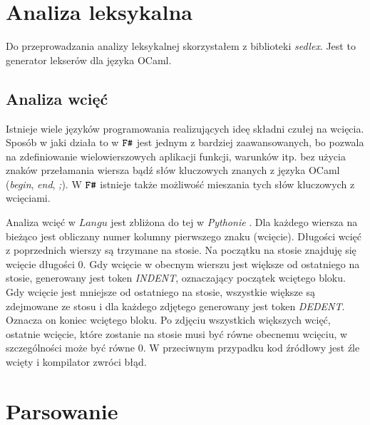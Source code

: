 \documentclass[declaration,shortabstract]{iithesis}
\begin{document}


\section{Analiza leksykalna}

Do przeprowadzania analizy leksykalnej skorzystałem z biblioteki 
\textit{sedlex}. Jest to generator lekserów dla języka OCaml.

\subsection{Analiza wcięć} \label{wciecia_omowienie}
 
Istnieje wiele języków programowania realizujących ideę składni czułej na 
wcięcia. Sposób w jaki działa to w $\verb!F#!$ jest jednym z bardziej zaawansowanych,
bo pozwala na zdefiniowanie wielowierszowych aplikacji funkcji, warunków itp. 
bez użycia znaków przełamania wiersza bądź słów kluczowych znanych 
z języka OCaml (\textit{begin}, \textit{end}, \textit{;}). W $\verb!F#!$ 
istnieje 
także możliwość mieszania tych słów kluczowych z wcięciami. 

Analiza wcięć w $Langu$ jest zbliżona do tej w \textit{Pythonie}
\cite{python_indentation}. Dla każdego wiersza
na bieżąco jest obliczany numer kolumny pierwszego znaku (wcięcie). Długości 
wcięć z poprzednich wierszy są trzymane na stosie. Na początku na stosie
znajduję się wcięcie długości $0$. Gdy wcięcie w obecnym wierszu jest większe od 
ostatniego na stosie, generowany jest token \textit{INDENT}, oznaczający 
początek wciętego bloku. Gdy wcięcie jest mniejsze od ostatniego na stosie, 
wszystkie większe są zdejmowane ze stosu i dla każdego zdjętego generowany 
jest token \textit{DEDENT}. Oznacza on koniec wciętego bloku. Po zdjęciu 
wszystkich większych wcięć, ostatnie wcięcie, które zostanie na stosie musi być 
równe obecnemu wcięciu, w szczególności może być równe $0$. W przeciwnym 
przypadku kod źródłowy jest źle wcięty i kompilator zwróci błąd.

\section{Parsowanie}
\end{document}
